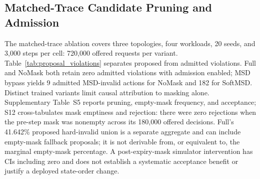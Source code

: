 \documentclass[final,5p]{elsarticle}
\newcommand{\rev}[1]{\textcolor{revisiongreen}{#1}}
\let\newrev\rev
\begin{document}
\subsection{Matched-Trace Candidate Pruning and Admission}
\label{subsec:mask_admission}
\newrev{The matched-trace ablation covers three topologies, four workloads, 20 seeds, and 3,000 steps per cell: 720,000 offered requests per variant. Table~\ref{tab:proposal_violations} separates proposed from admitted violations. Full and NoMask both retain zero admitted violations with admission enabled; MSD bypass yields 9 admitted MSD-invalid actions for NoMask and 182 for SoftMSD. Distinct trained variants limit causal attribution to masking alone. Supplementary Table~S5 reports pruning, empty-mask frequency, and acceptance; S12 cross-tabulates mask emptiness and rejection: there were zero rejections when the pre-step mask was nonempty across its 180,000 offered decisions. Full’s 41.642\% proposed hard-invalid union is a separate aggregate and can include empty-mask fallback proposals; it is not derivable from, or equivalent to, the marginal empty-mask percentage. A post-expiry-mask simulator intervention has CIs including zero and does not establish a systematic acceptance benefit or justify a deployed state-order change.}

\begin{table}[t]
\centering
\caption{\newrev{Proposed and admitted hard violations (\%; 720,000 simulator steps per variant across topologies, workloads, and seeds). CPU/RAM/bandwidth (BW)/MSD proposal rates overlap; Union counts requests with any proposed hard violation, and Admitted reports admitted hard violations. Every rate, including Admitted, divides by all 720,000 offered requests, not only admitted requests.}}
\label{tab:proposal_violations}
\scriptsize
\setlength{\tabcolsep}{3pt}
\end{table}
\end{document}

